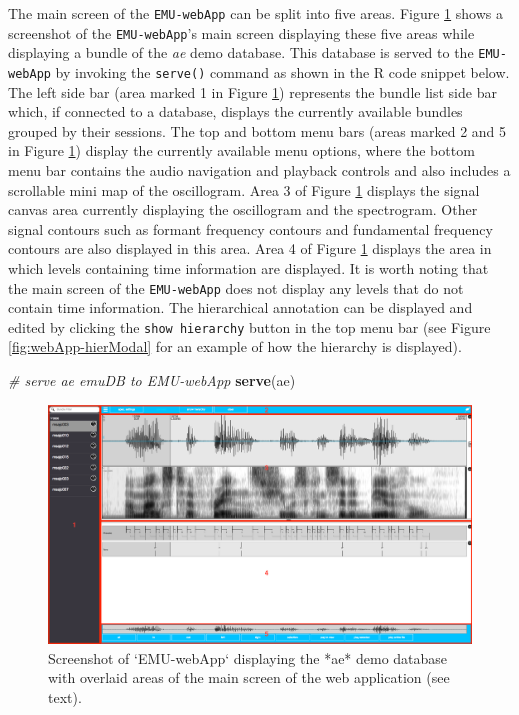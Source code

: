 \documentclass[]{book}
\newenvironment{Shaded}{\begin{snugshade}}{\end{snugshade}}
\newcommand{\CommentTok}[1]{\textcolor[rgb]{0.56,0.35,0.01}{\textit{#1}}}
\newcommand{\KeywordTok}[1]{\textcolor[rgb]{0.13,0.29,0.53}{\textbf{#1}}}
\newcommand{\NormalTok}[1]{#1}
\theoremstyle{definition}
\theoremstyle{definition}
\theoremstyle{definition}
\theoremstyle{remark}
\begin{document}
The main screen of the \texttt{EMU-webApp} can be split into five areas.
Figure \ref{fig:emu-web-emuWebAppLayout} shows a screenshot of the
\texttt{EMU-webApp}'s main screen displaying these five areas while
displaying a bundle of the \emph{ae} demo database. This database is
served to the \texttt{EMU-webApp} by invoking the \texttt{serve()}
command as shown in the R code snippet below. The left side bar (area
marked 1 in Figure \ref{fig:emu-web-emuWebAppLayout}) represents the
bundle list side bar which, if connected to a database, displays the
currently available bundles grouped by their sessions. The top and
bottom menu bars (areas marked 2 and 5 in Figure
\ref{fig:emu-web-emuWebAppLayout}) display the currently available menu
options, where the bottom menu bar contains the audio navigation and
playback controls and also includes a scrollable mini map of the
oscillogram. Area 3 of Figure \ref{fig:emu-web-emuWebAppLayout} displays
the signal canvas area currently displaying the oscillogram and the
spectrogram. Other signal contours such as formant frequency contours
and fundamental frequency contours are also displayed in this area. Area
4 of Figure \ref{fig:emu-web-emuWebAppLayout} displays the area in which
levels containing time information are displayed. It is worth noting
that the main screen of the \texttt{EMU-webApp} does not display any
levels that do not contain time information. The hierarchical annotation
can be displayed and edited by clicking the \texttt{show\ hierarchy}
button in the top menu bar (see Figure \ref{fig:webApp-hierModal} for an
example of how the hierarchy is displayed).

\begin{Shaded}
\begin{Highlighting}[]
\CommentTok{# serve ae emuDB to EMU-webApp}
\KeywordTok{serve}\NormalTok{(ae)}
\end{Highlighting}
\end{Shaded}

\begin{figure}

{\centering \includegraphics[width=1\linewidth]{pics/emu-webAppLayout} 

}

\caption{Screenshot of `EMU-webApp` displaying the *ae* demo database with overlaid areas of the main screen of the web application (see text).}\label{fig:emu-web-emuWebAppLayout}
\end{figure}
\end{document}
